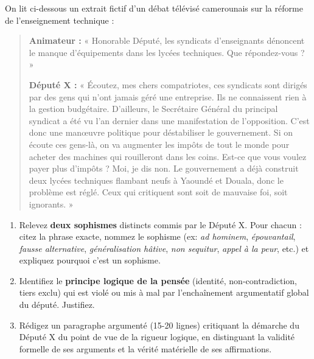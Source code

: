 \documentclass[11pt]{article}
\begin{document}
\begin{exercice}
On lit ci-dessous un extrait fictif d'un débat télévisé camerounais sur la réforme de l'enseignement technique :

\begin{quote}
\textbf{Animateur :} « Honorable Député, les syndicats d'enseignants dénoncent le manque d'équipements dans les lycées techniques. Que répondez-vous ? »

\textbf{Député X :} « Écoutez, mes chers compatriotes, ces syndicats sont dirigés par des gens qui n'ont jamais géré une entreprise. Ils ne connaissent rien à la gestion budgétaire. D'ailleurs, le Secrétaire Général du principal syndicat a été vu l'an dernier dans une manifestation de l'opposition. C'est donc une manœuvre politique pour déstabiliser le gouvernement. Si on écoute ces gens-là, on va augmenter les impôts de tout le monde pour acheter des machines qui rouilleront dans les coins. Est-ce que vous voulez payer plus d'impôts ? Moi, je dis non. Le gouvernement a déjà construit deux lycées techniques flambant neufs à Yaoundé et Douala, donc le problème est réglé. Ceux qui critiquent sont soit de mauvaise foi, soit ignorants. »
\end{quote}

\begin{enumerate}
    \item Relevez \textbf{deux sophismes} distincts commis par le Député X. Pour chacun : citez la phrase exacte, nommez le sophisme (ex: \emph{ad hominem}, \emph{épouvantail}, \emph{fausse alternative}, \emph{généralisation hâtive}, \emph{non sequitur}, \emph{appel à la peur}, etc.) et expliquez pourquoi c'est un sophisme.
    \item Identifiez le \textbf{principe logique de la pensée} (identité, non-contradiction, tiers exclu) qui est violé ou mis à mal par l'enchaînement argumentatif global du député. Justifiez.
    \item Rédigez un paragraphe argumenté (15-20 lignes) critiquant la démarche du Député X du point de vue de la rigueur logique, en distinguant la validité formelle de ses arguments et la vérité matérielle de ses affirmations.
\end{enumerate}
\end{exercice}
\end{document}
